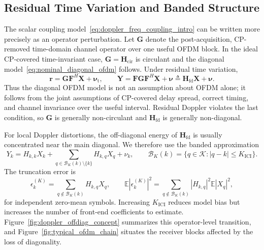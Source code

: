 \documentclass{wileysev}
\begin{document}
	
	\subsection{Residual Time Variation and Banded Structure}
	\label{ssec:banded_structure}
	
	The scalar coupling model~\eqref{eq:doppler_freq_coupling_intro} can be written more precisely as an operator perturbation. Let \(\mathbf G\) denote the post-acquisition, CP-removed time-domain channel operator over one useful OFDM block. In the ideal CP-covered time-invariant case, \(\mathbf G=\mathbf H_{\mathrm{cir}}\) is circulant and the diagonal model~\eqref{eq:nominal_diagonal_ofdm} follows. Under residual time variation,
	\begin{equation}
		\mathbf r
		= \mathbf G\mathbf F^{H}\mathbf X + \bm\nu_{\mathrm t},
		\qquad
		\mathbf Y
		= \mathbf F\mathbf G\mathbf F^{H}\mathbf X+\bm\nu
		\triangleq \mathbf H_{\mathrm{fd}}\mathbf X+\bm\nu .
		\label{eq:fd_matrix_model}
	\end{equation}
	Thus the diagonal OFDM model is not an assumption about OFDM alone; it follows from the joint assumptions of CP-covered delay spread, correct timing, and channel invariance over the useful interval. Residual Doppler violates the last condition, so \(\mathbf G\) is generally non-circulant and \(\mathbf H_{\mathrm{fd}}\) is generally non-diagonal.
	
	For local Doppler distortions, the off-diagonal energy of \(\mathbf H_{\mathrm{fd}}\) is usually concentrated near the main diagonal. We therefore use the banded approximation
	\begin{equation}
		Y_k
		= H_{k,k}X_k
		+ \sum_{q\in\mathcal B_K(k)\setminus\{k\}} H_{k,q}X_q
		+ \nu_k,
		\qquad
		\mathcal B_K(k)=\{q\in\mathcal K: |q-k|\le K_{\mathrm{ICI}}\}.
		\label{eq:rigorous_banded_ici}
	\end{equation}
	The truncation error is
	\begin{equation}
		\epsilon_k^{(K)}
		= \sum_{q\notin\mathcal B_K(k)}H_{k,q}X_q,
		\qquad
		\mathbb E|\epsilon_k^{(K)}|^2
		= \sum_{q\notin\mathcal B_K(k)} |H_{k,q}|^2\mathbb E|X_q|^2,
		\label{eq:rigorous_truncation_error}
	\end{equation}
	for independent zero-mean symbols. Increasing \(K_{\mathrm{ICI}}\) reduces model bias but increases the number of front-end coefficients to estimate. Figure~\ref{fig:doppler_offdiag_concept} summarizes this operator-level transition, and Figure~\ref{fig:typical_ofdm_chain} situates the receiver blocks affected by the loss of diagonality.
	
\end{document}
